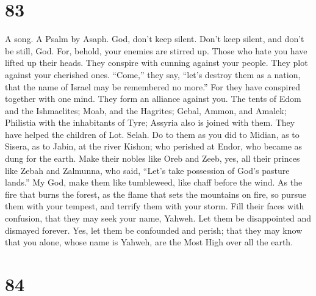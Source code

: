 \hypertarget{section-75}{%
\section{83}\label{section-75}}

A song. A Psalm by Asaph.  God, don't keep silent. Don't
keep silent, and don't be still, God.  For, behold, your
enemies are stirred up. Those who hate you have lifted up their heads.
 They conspire with cunning against your people. They plot
against your cherished ones.  ``Come,'' they say, ``let's
destroy them as a nation, that the name of Israel may be remembered no
more.''  For they have conspired together with one mind.
They form an alliance against you.  The tents of Edom and
the Ishmaelites; Moab, and the Hagrites;  Gebal, Ammon,
and Amalek; Philistia with the inhabitants of Tyre; 
Assyria also is joined with them. They have helped the children of Lot.
Selah.  Do to them as you did to Midian, as to Sisera, as
to Jabin, at the river Kishon;  who perished at Endor,
who became as dung for the earth.  Make their nobles like
Oreb and Zeeb, yes, all their princes like Zebah and Zalmunna,
 who said, ``Let's take possession of God's pasture
lands.''  My God, make them like tumbleweed, like chaff
before the wind.  As the fire that burns the forest, as
the flame that sets the mountains on fire,  so pursue
them with your tempest, and terrify them with your storm.
 Fill their faces with confusion, that they may seek your
name, Yahweh.  Let them be disappointed and dismayed
forever. Yes, let them be confounded and perish;  that
they may know that you alone, whose name is Yahweh, are the Most High
over all the earth.

\hypertarget{section-76}{%
\section{84}\label{section-76}}

